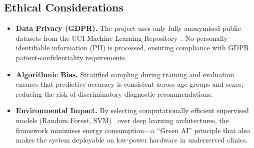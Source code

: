 \documentclass[12pt, a4paper]{article}
\begin{document}
\subsection{Ethical Considerations}

\begin{itemize}
  \item \textbf{Data Privacy (GDPR).} The project uses only fully anonymised
    public datasets from the UCI Machine Learning
    Repository~\cite{uci_heart}. No personally identifiable information (PII)
    is processed, ensuring compliance with GDPR patient-confidentiality
    requirements.

  \item \textbf{Algorithmic Bias.} Stratified sampling during training and
    evaluation ensures that predictive accuracy is consistent across age groups
    and sexes, reducing the risk of discriminatory diagnostic recommendations.

  \item \textbf{Environmental Impact.} By selecting computationally efficient
    supervised models (Random Forest,
    SVM)~\cite{rf_heart2021} over deep learning architectures,
    the framework minimises energy consumption---a ``Green AI'' principle that
    also makes the system deployable on low-power hardware in underserved
    clinics.
\end{itemize}

\newpage


\end{document}
